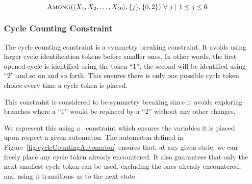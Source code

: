 \documentclass[../Document.tex]{subfiles}
\begin{document}
$$
    \mbox{\sc Among}(\langle X_1, X_2, \ldots, X_{40} \rangle, \{j\}, \{0,2\})\ \forall\ j\ \vert\ 1 \leq j \leq 6
$$

\subsubsection{Cycle Counting Constraint}
The cycle counting constraint is a symmetry breaking constraint. It avoids using larger cycle identification tokens before smaller ones. In other words, the first opened cycle is identified using the token ``1'', the second will be identified using ``2'' and so on and so forth.
This ensures there is only one possible cycle token choice every time a cycle token is placed.

This constraint is considered to be symmetry breaking since it avoids exploring branches where a ``1'' would be replaced by a ``2'' without any other changes.

We represent this using a \regular\ constraint which ensures the variables it is placed upon respect a given automaton. The automaton defined in Figure~\ref{fig:cycleCountingAutomaton} ensures that, at any given state, we can freely place any cycle token already encountered. It also guarantees that only the next smallest cycle token can be used, excluding the ones already encountered, and using it transitions us to the next state.
\end{document}

